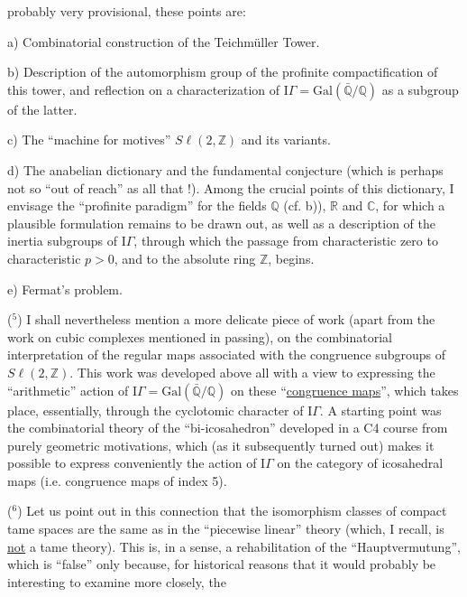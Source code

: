 
probably very provisional, these points are:

a) Combinatorial construction of the Teichmüller Tower.

b) Description of the automorphism group of the profinite
compactification of this tower, and reflection on a characterization
of $\mathrm{I}\!\Gamma = \mathrm{Gal}(\bar{\mathbb{Q}}/\mathbb{Q})$ as a subgroup of the latter.

c) The ``machine for motives'' $S\ell(2,\mathbb{Z})$ and its variants.

d) The anabelian dictionary and the fundamental conjecture
(which is perhaps not so ``out of reach'' as all that !). Among
the crucial points of this dictionary, I envisage the ``profinite
paradigm'' for the fields $\mathbb{Q}$ (cf. b)), $\mathbb{R}$ and $\mathbb{C}$, for which a plausible
formulation remains to be drawn out, as well as a description of the
inertia subgroups of $\mathrm{I}\!\Gamma$, through which the passage from characteristic
zero to characteristic $p > 0$, and to the absolute ring $\mathbb{Z}$, begins.

e) Fermat's problem.

($^5$) I shall nevertheless mention a more delicate piece of work (apart from
the work on cubic complexes mentioned in passing), on
the combinatorial interpretation of the regular maps associated with
the congruence subgroups of $S\ell(2,\mathbb{Z})$. This work was developed
above all with a view to expressing the ``arithmetic'' action of $\mathrm{I}\!\Gamma = \mathrm{Gal}(\bar{\mathbb{Q}}/\mathbb{Q})$
on these ``\uline{congruence maps}'', which takes place, essentially,
through the cyclotomic character of $\mathrm{I}\!\Gamma$. A starting
point was the combinatorial theory of the ``bi-icosahedron'' developed
in a C4 course from purely geometric motivations,
which (as it subsequently turned out) makes it possible to express conveniently
the action of $\mathrm{I}\!\Gamma$ on the category of icosahedral maps (i.e.
congruence maps of index 5).

($^6$) Let us point out in this connection that the isomorphism classes of
compact tame spaces are the same as in the ``piecewise
linear'' theory (which, I recall, is \uline{not} a tame theory).
This is, in a sense, a rehabilitation of the ``Hauptvermutung'',
which is ``false'' only because, for historical reasons
that it would probably be interesting to examine more closely, the

